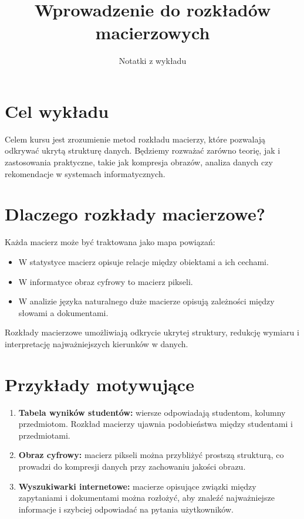 \documentclass[10pt,a4paper]{article}
\title{Wprowadzenie do rozkładów macierzowych}
\author{Notatki z wykładu}
\date{}
\begin{document}
\maketitle

\section*{Cel wykładu}
Celem kursu jest zrozumienie metod rozkładu macierzy, które pozwalają 
odkrywać ukrytą strukturę danych. 
Będziemy rozważać zarówno teorię, jak i zastosowania praktyczne, 
takie jak kompresja obrazów, analiza danych czy rekomendacje w systemach informatycznych.

\section*{Dlaczego rozkłady macierzowe?}
Każda macierz może być traktowana jako mapa powiązań:
\begin{itemize}
    \item W statystyce macierz opisuje relacje między obiektami a ich cechami.
    \item W informatyce obraz cyfrowy to macierz pikseli.
    \item W analizie języka naturalnego duże macierze opisują zależności 
    między słowami a dokumentami.
\end{itemize}
Rozkłady macierzowe umożliwiają odkrycie ukrytej struktury, 
redukcję wymiaru i interpretację najważniejszych kierunków w danych.

\section*{Przykłady motywujące}
\begin{enumerate}
    \item \textbf{Tabela wyników studentów:} 
    wiersze odpowiadają studentom, kolumny przedmiotom. 
    Rozkład macierzy ujawnia podobieństwa między studentami i przedmiotami.
    
    \item \textbf{Obraz cyfrowy:} 
    macierz pikseli można przybliżyć prostszą strukturą, 
    co prowadzi do kompresji danych przy zachowaniu jakości obrazu.
    
    \item \textbf{Wyszukiwarki internetowe:} 
    macierze opisujące związki między zapytaniami i dokumentami 
    można rozłożyć, aby znaleźć najważniejsze informacje i szybciej odpowiadać na pytania użytkowników.
\end{enumerate}
\end{document}
